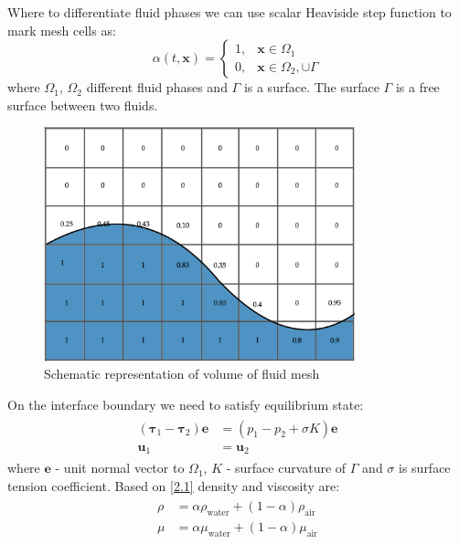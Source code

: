 Where to differentiate fluid phases we can use scalar Heaviside step function to mark mesh cells as:
\begin{equation}\label{2.1}
\alpha(t, \mathbf{x})=\left\{\begin{array}{ll}
1, & \mathbf{x} \in \Omega_{1} \\
0, & \mathbf{x} \in \Omega_{2}, \cup \Gamma
\end{array}\right.
\end{equation}
where $\Omega_{1}$, $\Omega_{2}$ different fluid phases and $\Gamma$ is a surface. The surface $\Gamma$ is a free surface between two fluids.
\begin{figure}[!ht]
    \centering
    \includegraphics[width=9cm]{Images/VOF_free_surface.png}
    \caption{Schematic representation of volume of fluid mesh}
    \label{fig:galaxy}
\end{figure}
On the interface boundary we need to satisfy equilibrium state:
\begin{equation}
\begin{array}{c}
\begin{aligned}
\left(\boldsymbol{\tau}_{1}-\boldsymbol{\tau}_{2}\right) \mathbf{e}&=\left(p_{1}-p_{2}+\sigma K\right) \mathbf{e} \\
\mathbf{u}_{1} &=\mathbf{u}_{2}
\end{aligned}
\end{array}
\end{equation}
where $\mathbf{e}$ - unit normal vector to $\Omega_1$, $K$ - surface curvature of $\Gamma$ and $\sigma$ is surface tension coefficient. Based on \ref{2.1} density and viscosity are:
\begin{equation}
\begin{array}{c}
\begin{aligned}
        \rho &= \alpha \rho_{\text {water}}+(1-\alpha) \rho_{\text {air}} \\
        \mu &= \alpha \mu_{\text {water}}+(1-\alpha) \mu_{\text {air}}
\end{aligned}
\end{array}
\end{equation}
